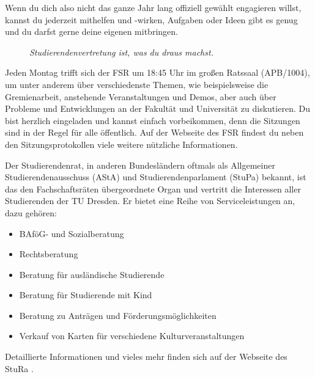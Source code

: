 Wenn du dich also nicht das ganze Jahr lang offiziell gewählt engagieren willst, kannst du jederzeit mithelfen und -wirken, Aufgaben oder Ideen gibt es genug und du darfst gerne deine eigenen mitbringen. 

\begin{figure}[h!]
\centering
\textit{Studierendenvertretung ist, was du draus machst.}
\end{figure}

Jeden Montag trifft sich der FSR um 18:45 Uhr im großen Ratssaal (APB/1004), um unter anderem über verschiedenste Themen, wie beispielsweise die Gremienarbeit, anstehende Veranstaltungen und Demos, aber auch über Probleme und Entwicklungen an der Fakultät und Universität zu diskutieren.
Du bist herzlich eingeladen und kannst einfach vorbeikommen, denn die Sitzungen sind in der Regel für alle öffentlich. Auf der Webseite des FSR  findest du neben den Sitzungsprotokollen  viele weitere nützliche Informationen.

Der Studierendenrat, in anderen Bundesländern oftmals als Allgemeiner Studierendenausschuss (AStA) und Studierendenparlament (StuPa) bekannt, ist das den Fachschaftsräten übergeordnete Organ und vertritt die Interessen aller Studierenden der TU Dresden. Er bietet eine Reihe von Serviceleistungen an, dazu gehören:
\begin{itemize}
\item BAföG- und Sozialberatung
\item Rechtsberatung
\item Beratung für ausländische Studierende
\item Beratung für Studierende mit Kind
\item Beratung zu Anträgen und Förderungsmöglichkeiten
\item Verkauf von Karten für verschiedene Kulturveranstaltungen
\end{itemize}

Detaillierte Informationen und vieles mehr finden sich auf der Webseite des StuRa .


